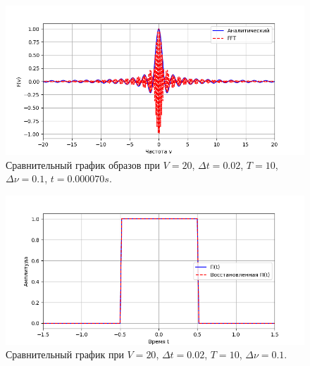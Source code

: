\documentclass[a4paper]{article}
\begin{document}
\begin{figure}[H]
  \centering
  \includegraphics[width=\textwidth]{src/task_1_2/freq_10_0.02_20_0.1.png}
  \caption{Сравнительный график образов при $V=20$, $\Delta t=0.02$, $T=10$, $\Delta \nu=0.1$, $t=0.000070 s$.} 
\end{figure}
\begin{figure}[H]
  \centering
  \includegraphics[width=\textwidth]{src/task_1_2/time_10_0.02_20_0.1.png}
  \caption{Сравнительный график при $V=20$, $\Delta t=0.02$, $T=10$, $\Delta \nu=0.1$.} 
\end{figure}
\end{document}

